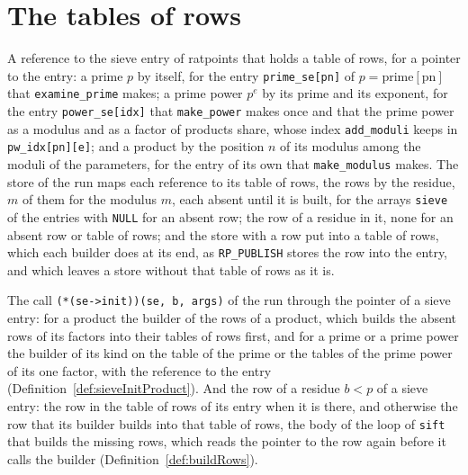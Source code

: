 \section{The tables of rows}\label{sec:rowStore}

\begin{definition}\label{def:entryRef}
  \leanok
  A reference to the sieve entry of ratpoints that holds a table of rows, for a pointer to the
  entry: a prime $p$ by itself, for the entry \verb|prime_se[pn]| of
  $p = \mathrm{prime}[\mathrm{pn}]$ that \verb|examine_prime| makes; a prime power $p^e$ by its
  prime and its exponent, for the entry \verb|power_se[idx]| that \verb|make_power| makes once and
  that the prime power as a modulus and as a factor of products share, whose index \verb|add_moduli|
  keeps in \verb|pw_idx[pn][e]|; and a product by the position $n$ of its modulus among the moduli
  of the parameters, for the entry of its own that \verb|make_modulus| makes. The store of the run
  maps each reference to its table of rows, the rows by the residue, $m$ of them for the modulus
  $m$, each absent until it is built, for the arrays \verb|sieve| of the entries with \verb|NULL|
  for an absent row; the row of a residue in it, none for an absent row or table of rows; and the
  store with a row put into a table of rows, which each builder does at its end, as
  \verb|RP_PUBLISH| stores the row into the entry, and which leaves a store without that table of
  rows as it is.
\end{definition}

\begin{definition}\label{def:fetchRow}
  \leanok
  The call \verb|(*(se->init))(se, b, args)| of the run through the pointer of a sieve entry: for a
  product the builder of the rows of a product, which builds the absent rows of its factors into
  their tables of rows first, and for a prime or a prime power the builder of its kind on the table
  of the prime or the tables of the prime power of its one factor, with the reference to the entry
  (Definition~\ref{def:sieveInitProduct}). And the row of a residue $b < p$ of a sieve entry: the
  row in the table of rows of its entry when it is there, and otherwise the row that its builder
  builds into that table of rows, the body of the loop of \verb|sift| that builds the missing rows,
  which reads the pointer to the row again before it calls the builder
  (Definition~\ref{def:buildRows}).
\end{definition}

